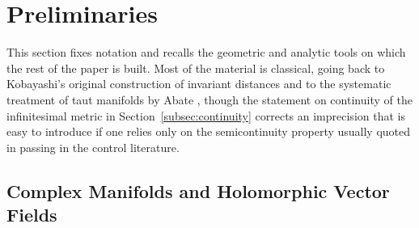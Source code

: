 \documentclass[preprint,12pt,authoryear]{elsarticle}
\begin{document}
%
%
%
%
%
%
%
%

\section{Preliminaries}
\label{sec:prelim}

This section fixes notation and recalls the geometric and analytic tools on which the rest of the paper is built. Most of the material is classical, going back to Kobayashi's original construction of invariant distances \cite{kobayashi1967invariant} and to the systematic treatment of taut manifolds by Abate \cite{abate1989iteration}, though the statement on continuity of the infinitesimal metric in Section~\ref{subsec:continuity} corrects an imprecision that is easy to introduce if one relies only on the semicontinuity property usually quoted in passing in the control literature.

\subsection{Complex Manifolds and Holomorphic Vector Fields}
\end{document}
